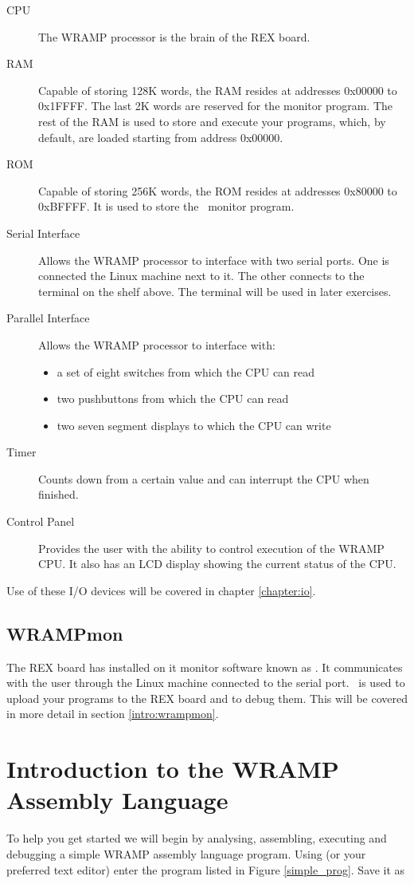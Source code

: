\begin{description}
\item[CPU] The WRAMP processor is the brain of the REX board.
%
\item[RAM] Capable of storing 128K words, the RAM resides at addresses 0x00000
to 0x1FFFF.  The last 2K words are reserved for the monitor program.  The rest 
of the RAM is used to store and execute your programs, which, by default, are 
loaded starting from address 0x00000.
%
\item[ROM] Capable of storing 256K words, the ROM resides at addresses 
0x80000 to 0xBFFFF.  It is used to store the \WRAMPmon\ monitor program.
%
\item[Serial Interface] Allows the WRAMP processor to interface with two serial
ports.  One is connected the Linux machine next to it.  The other connects to
the terminal on the shelf above.  The terminal will be used in later 
exercises.
%
\item[Parallel Interface] Allows the WRAMP processor to interface with: 
\begin{itemize}
\item a set of eight switches from which the CPU can read
\item two pushbuttons from which the CPU can read
\item two seven segment displays to which the CPU can write
\end{itemize}
\item[Timer] Counts down from a certain value and can interrupt the CPU when 
finished.
\item[Control Panel] Provides the user with the ability to control execution
of the WRAMP CPU.  It also has an LCD display showing the current status
of the CPU.
%
\end{description}
Use of these I/O devices will be covered in chapter \ref{chapter:io}.


\subsection{WRAMPmon}
The REX board has installed on it monitor software known as \WRAMPmon.
It communicates with the user through the Linux machine connected to
the serial port. \WRAMPmon\ is used to upload your programs to the REX
board and to debug them.  This will be covered in more detail in
section \ref{intro:wrampmon}.
%
%
%
\section{Introduction to the WRAMP Assembly Language} %
%
To help you get started we will begin by analysing,  assembling, 
executing and debugging a simple WRAMP assembly language program.
Using  (or your preferred text editor) enter the  
program listed in Figure \ref{simple_prog}. Save it as 

